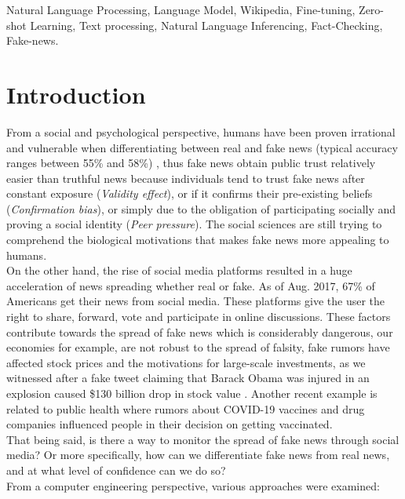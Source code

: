 \documentclass[conference]{IEEEtran}
\begin{document}
\begin{IEEEkeywords}
Natural Language Processing, Language Model, Wikipedia, Fine-tuning, Zero-shot Learning, Text processing, Natural Language Inferencing, Fact-Checking, Fake-news.
\end{IEEEkeywords}

\section{Introduction}
From a social and psychological perspective, humans have been proven irrational and vulnerable when differentiating between real and fake news (typical accuracy ranges between 55\% and 58\%) \cite{zhou2019fake}, thus fake news obtain public trust relatively easier than truthful news because individuals tend to trust fake news after constant exposure (\textit{Validity effect}), or if it confirms their pre-existing beliefs (\textit{Confirmation bias}), or simply due to the obligation of participating socially and proving a social identity (\textit{Peer pressure}). The social sciences are still trying to comprehend the biological motivations that makes fake news more appealing to humans.\\

On the other hand, the rise of social media platforms resulted in a huge acceleration of news spreading whether real or fake. As of Aug. 2017, 67\% \cite{zhou2019fake} of Americans get their news from social media. These platforms give the user the right to share, forward, vote and participate in online discussions. These factors contribute towards the spread of fake news which is considerably dangerous, our economies for example, are not robust to the spread of falsity, fake rumors have affected stock prices and the motivations for large-scale investments, as we witnessed after a fake tweet claiming that Barack Obama was injured in an explosion caused \$130 billion drop in stock value \cite{vosoughi2018spread}. Another recent example is related to public health where rumors about COVID-19 vaccines and drug companies influenced people in their decision on getting vaccinated.\\

That being said, is there a way to monitor the spread of fake news through social media? Or more specifically, how can we differentiate fake news from real news, and at what level of confidence can we do so?\\

From a computer engineering perspective, various approaches were examined:
\end{document}
